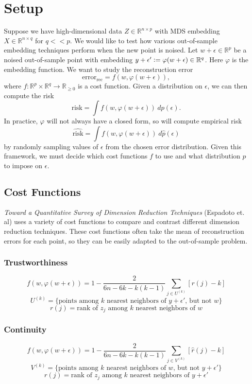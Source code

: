 \documentclass{article}
\begin{document}
\section{Setup}
Suppose we have high-dimensional data $Z \in \mathbb{R}^{n \times p}$ with MDS embedding $X \in \mathbb{R}^{n \times q}$ for $q << p$. We would like to test how various out-of-sample embedding techniques perform when the new point is noised. Let $w + \epsilon \in \mathbb{R}^p$ be a noised out-of-sample point with embedding $y + \epsilon' \vcentcolon = \varphi(w + \epsilon) \in \mathbb{R}^q$. Here $\varphi$ is the embedding function. We want to study the reconstruction error $$\textrm{error}_\textrm{rec} = f(w, \varphi(w + \epsilon)),$$ where $f: \mathbb{R}^p \times \mathbb{R}^q \to \mathbb{R}_{\geq 0}$ is a cost function. Given a distribution on $\epsilon$, we can then compute the risk $$\textrm{risk} = \int f(w, \varphi(w + \epsilon)) \:dp(\epsilon).$$ In practice, $\varphi$ will not always have a closed form, so will compute empirical risk $$\hat{\textrm{risk}} = \int f(w, \varphi(w + \epsilon)) \:d\hat{p}(\epsilon)$$ by randomly sampling values of $\epsilon$ from the chosen error distribution. Given this framework, we must decide which cost functions $f$ to use and what distribution $p$ to impose on $\epsilon$.

\subsection{Cost Functions}
\textit{Toward a Quantitative Survey of Dimension Reduction Techniques} (Espadoto et. al) uses a variety of cost functions to compare and contrast different dimension reduction techniques. These cost functions often take the mean of reconstruction errors for each point, so they can be easily adapted to the out-of-sample problem.

\subsubsection{Trustworthiness}
$$f(w, \varphi(w + \epsilon)) = 1 - \frac{2}{6n - 6k - k(k-1)} \sum_{j \in U^{(k)}} \left[ r(j) - k \right]$$
$$U^{(k)} = \{\textrm{points among $k$ nearest neighbors of $y + \epsilon'$, but not $w$}\}$$
$$r(j)  = \textrm{rank of $z_j$ among $k$ nearest neighbors of $w$}$$

\subsubsection{Continuity}
$$f(w, \varphi(w + \epsilon)) = 1 - \frac{2}{6n - 6k - k(k-1)} \sum_{j \in V^{(k)}} \left[ \hat{r}(j) - k \right]$$
$$V^{(k)} = \{\textrm{points among $k$ nearest neighbors of $w$, but not $y + \epsilon'$}\}$$
$$r(j)  = \textrm{rank of $z_j$ among $k$ nearest neighbors of $y + \epsilon'$}$$
\end{document}
